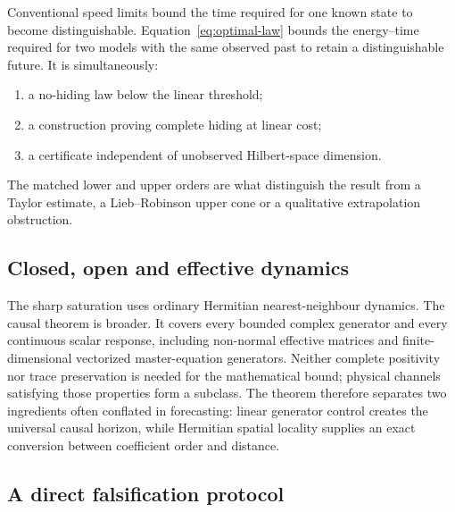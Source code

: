 \documentclass[10pt]{article}
\numberwithin{equation}{section}
\theoremstyle{definition}
\theoremstyle{remark}
\begin{document}
Conventional speed limits bound the time required for one known state to
become distinguishable.  Equation~\eqref{eq:optimal-law} bounds the
energy--time required for two models with the same observed past to retain
a distinguishable future.  It is simultaneously:
\begin{enumerate}
\item a no-hiding law below the linear threshold;
\item a construction proving complete hiding at linear cost;
\item a certificate independent of unobserved Hilbert-space dimension.
\end{enumerate}
The matched lower and upper orders are what distinguish the result from a
Taylor estimate, a Lieb--Robinson upper cone or a qualitative
extrapolation obstruction.

\subsection{Closed, open and effective dynamics}

The sharp saturation uses ordinary Hermitian nearest-neighbour dynamics.
The causal theorem is broader.  It covers every bounded complex generator
and every continuous scalar response, including non-normal effective
matrices and finite-dimensional vectorized master-equation generators.
Neither complete positivity nor trace preservation is needed for the
mathematical bound; physical channels satisfying those properties form a
subclass.  The theorem therefore separates two ingredients often conflated
in forecasting: linear generator control creates the universal causal
horizon, while Hermitian spatial locality supplies an exact conversion
between coefficient order and distance.

\subsection{A direct falsification protocol}
\end{document}
